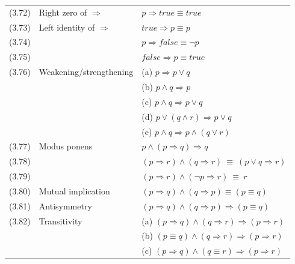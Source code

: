 \documentclass[letterpaper, 8pt]{extarticle}
\newcommand{\To}{\Rightarrow}
\begin{document}
\begin{multicols*}{3}
\begin{tabulary}{\linewidth}{@{}lLL@{}}
        (3.72) & Right zero of $\To$                   & $p \To \textit{true} \equiv \textit{true}$              \\
        (3.73) & Left identity of $\To$                & $\textit{true} \To p \equiv p$                          \\
        (3.74) &                                       & $p \To \textit{false} \equiv \neg p$                    \\
        (3.75) &                                       & $\textit{false} \To p \equiv true$                      \\
        (3.76) & Weakening/strengthening               & (a) $p \To p \lor q$                                    \\
        &                                       & (b) $p \land q \To p$                                   \\
        &                                       & (c) $p \land q \To p \lor q$                            \\
        &                                       & (d) $p \lor (q \land r) \To p \lor q$                   \\
        &                                       & (e) $p \land q \To p \land (q \lor r)$                  \\
        (3.77) & Modus ponens                          & $p \land (p \To q) \To q$                               \\
        (3.78) &                                       & $(p \To r) \land (q \To r) \ \equiv \ (p \lor q \To r)$ \\
        (3.79) &                                       & $(p \To r) \land (\neg p \To r) \ \equiv \ r$           \\
        (3.80) & Mutual implication                    & $(p \To q) \land (q \To p) \equiv (p \equiv q)$         \\
        (3.81) & Antisymmetry                          & $(p \To q) \land (q \To p) \To (p \equiv q)$            \\
        (3.82) & Transitivity                          & (a) $(p \To q) \land (q \To r) \To (p \To r)$           \\
        &                                       & (b) $(p \equiv q) \land (q \To r) \To (p \To r)$        \\
        &                                       & (c) $(p \To q) \land (q \equiv r) \To (p \To r)$        \\
    \end{tabulary}


\end{multicols*}
\end{document}
